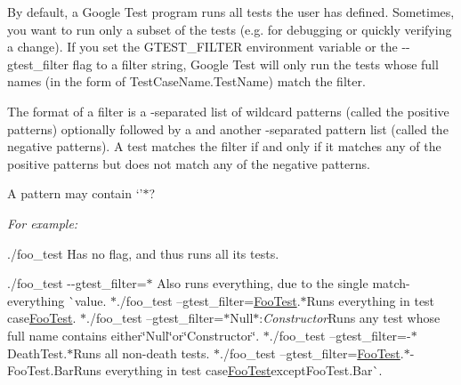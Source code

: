 By default, a Google Test program runs all tests the user has defined. Sometimes, you want to run only a subset of the tests (e.\+g. for debugging or quickly verifying a change). If you set the {\ttfamily G\+T\+E\+S\+T\+\_\+\+F\+I\+L\+T\+ER} environment variable or the {\ttfamily -\/-\/gtest\+\_\+filter} flag to a filter string, Google Test will only run the tests whose full names (in the form of {\ttfamily Test\+Case\+Name.\+Test\+Name}) match the filter.

The format of a filter is a \textquotesingle{}{\ttfamily \+:}\textquotesingle{}-\/separated list of wildcard patterns (called the positive patterns) optionally followed by a \textquotesingle{}{\ttfamily -\/}\textquotesingle{} and another \textquotesingle{}{\ttfamily \+:}\textquotesingle{}-\/separated pattern list (called the negative patterns). A test matches the filter if and only if it matches any of the positive patterns but does not match any of the negative patterns.

A pattern may contain `'$\ast$\textquotesingle{}?

{\itshape For example\+:}

{\itshape 
\begin{DoxyItemize}
\item {\ttfamily ./foo\+\_\+test} Has no flag, and thus runs all its tests.
\item {\ttfamily ./foo\+\_\+test -\/-\/gtest\+\_\+filter=$\ast$} Also runs everything, due to the single match-\/everything \`{}{\ttfamily value. $\ast$}./foo\+\_\+test --gtest\+\_\+filter=\mbox{\hyperlink{class_foo_test}{Foo\+Test}}.$\ast${\ttfamily Runs everything in test case}\mbox{\hyperlink{class_foo_test}{Foo\+Test}}{\ttfamily . $\ast$}./foo\+\_\+test --gtest\+\_\+filter=$\ast$\+Null$\ast$\+:{\itshape Constructor}{\ttfamily Runs any test whose full name contains either}\char`\"{}\+Null\char`\"{}{\ttfamily or}\char`\"{}\+Constructor\char`\"{}{\ttfamily . $\ast$}./foo\+\_\+test --gtest\+\_\+filter=-\/$\ast$\+Death\+Test.$\ast${\ttfamily Runs all non-\/death tests. $\ast$}./foo\+\_\+test --gtest\+\_\+filter=\mbox{\hyperlink{class_foo_test}{Foo\+Test}}.$\ast$-\/\+Foo\+Test.Bar{\ttfamily Runs everything in test case}\mbox{\hyperlink{class_foo_test}{Foo\+Test}}{\ttfamily except}Foo\+Test.\+Bar\`{}.
\end{DoxyItemize}}

